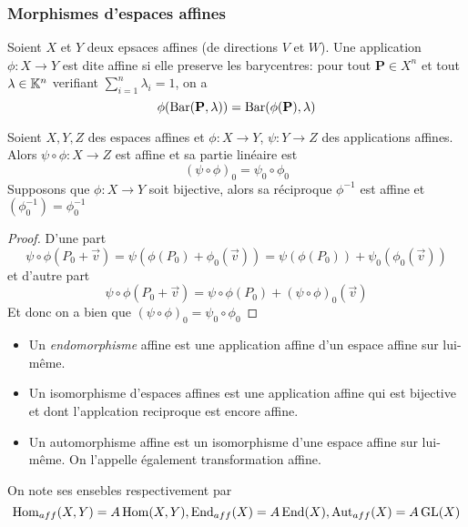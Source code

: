 \subsubsection{Morphismes d'espaces affines}

\begin{definition}
	Soient $X$ et $Y$ deux epsaces affines (de directions $V$ et $W$). Une
	application $\phi: X \to Y$ est dite affine si elle preserve les barycentres:
	pour tout $\mathbf{P} \in X^n$ et tout
	$\mathbf{\lambda} \in \mathbb{K}^n$ verifiant
	$\sum_{i=1}^n \lambda_i = 1$, on a
	\begin{equation*}
		\phi(\operatorname{Bar}(\mathbf{P}, \mathbf{\lambda})) = 
		\operatorname{Bar}(\phi(\mathbf{P}), \mathbf{\lambda})
	\end{equation*}
\end{definition}

\begin{proposition}
	Soient $X, Y, Z$ des espaces affines et $\phi: X \to Y$, 
	$\psi: Y \to Z$ des applications affines. Alors
	$\psi \circ \phi : X \to Z$ est affine et sa partie linéaire est
	\begin{equation*}
		(\psi \circ \phi)_0 = \psi_0 \circ \phi_0
	\end{equation*}
	Supposons que $\phi: X \to Y$ soit bijective, alors sa réciproque $\phi^{-1}$
	est affine et $(\phi^{-1}_0) = \phi_0^{-1}$
\end{proposition}

\begin{proof}
	D'une part
	\begin{equation*}
		\psi \circ \phi (P_0 + \vec{v}) = \psi(\phi(P_0) + \phi_0(\vec{v}))
		= \psi(\phi(P_0)) + \psi_0(\phi_0(\vec{v}))
	\end{equation*}
	et d'autre part 
	\begin{equation*}
		\psi \circ \phi (P_0 + \vec{v})
		= \psi \circ \phi(P_0) + (\psi \circ \phi)_0(\vec{v})
	\end{equation*}
	Et donc on a bien que $(\psi \circ \phi)_0 = \psi_0 \circ \phi_0$ 
\end{proof}

\begin{definition}
	\begin{itemize}
		\item Un \emph{endomorphisme} affine est une application affine d'un
			espace affine sur lui-même.
		\item Un isomorphisme d'espaces affines est une application affine
			qui est bijective et dont l'applcation reciproque est encore affine.
		\item Un automorphisme affine est un isomorphisme d'une espace affine sur
			lui-même. On l'appelle également transformation affine.
	\end{itemize}
	On note ses ensebles respectivement par
	\begin{equation*}
		\operatorname{Hom}_{aff}(X, Y) = A \operatorname{Hom}(X, Y), \operatorname{End}_{aff}(X) = A\operatorname{End}(X),
		\operatorname{Aut}_{aff}(X) = A\operatorname{GL}(X)
	\end{equation*}
\end{definition}



